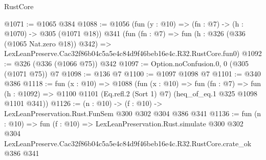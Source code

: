 \begin{lexlean}{RustCore}
\begin{coremodule}
@1071 := @1065 @384
@1088 := @1056
    (fun (y : @10) => (fn : @7) -> (h : @1070) -> @305 (@1071 @18))
    @341
    (fun (fn : @7) =>
    fun (h : @326 (@336 (@1065 Nat.zero @18)) @342) =>
    LexLeanPreserve.Cac32f86b04c5a5e4c84d9f46beb16e4c.R32.RustCore.fun0)
@1092 := @326 (@336 (@1066 @75)) @342
@1097 := Option.noConfusion.{0, 0} (@305 (@1071 @75)) @7
@1098 := @136 @7
@1100 := @1097 @1098 @7
@1101 := @340 @386
@1118 := fun (x : @10) =>
  @1088
    (fun (x : @10) =>
    fun (fn : @7) =>
    fun (h : @1092) => @1100 @1101 (Eq.refl.{2} (Sort 1) @7) (heq_of_eq.{1} @325 @1098 @1101 @341))
@1126 := (n : @10) -> (f : @10) -> LexLeanPreservation.Rust.FunSem @300 @302 @304 @386 @341
@1136 := fun (n : @10) =>
  fun (f : @10) =>
  LexLeanPreservation.Rust.simulate
    @300
    @302
    @304
    LexLeanPreserve.Cac32f86b04c5a5e4c84d9f46beb16e4c.R32.RustCore.crate_ok
    @386
    @341
\end{coremodule}
\end{lexlean}
